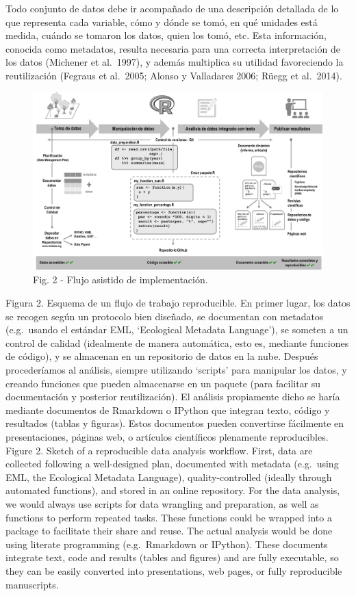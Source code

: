 \documentclass[]{tufte-handout}
\begin{document}
Todo conjunto de datos debe ir acompañado de una descripción detallada
de lo que representa cada variable, cómo y dónde se tomó, en qué
unidades está medida, cuándo se tomaron los datos, quien los tomó, etc.
Esta información, conocida como metadatos, resulta necesaria para una
correcta interpretación de los datos (Michener et al.~1997), y además
multiplica su utilidad favoreciendo la reutilización (Fegraus et
al.~2005; Alonso y Valladares 2006; Rüegg et al.~2014).

\begin{figure}
\includegraphics[width=1\linewidth]{images/fig_-001} \caption[Fig]{Fig. 2 - Flujo asistido de implementación.}\label{fig:unnamed-chunk-2}
\end{figure}

Figura 2. Esquema de un flujo de trabajo reproducible. En primer lugar,
los datos se recogen según un protocolo bien diseñado, se documentan con
metadatos (e.g.~usando el estándar EML, `Ecological Metadata Language'),
se someten a un control de calidad (idealmente de manera automática,
esto es, mediante funciones de código), y se almacenan en un repositorio
de datos en la nube. Después procederíamos al análisis, siempre
utilizando `scripts' para manipular los datos, y creando funciones que
pueden almacenarse en un paquete (para facilitar su documentación y
posterior reutilización). El análisis propiamente dicho se haría
mediante documentos de Rmarkdown o IPython que integran texto, código y
resultados (tablas y figuras). Estos documentos pueden convertirse
fácilmente en presentaciones, páginas web, o artículos científicos
plenamente reproducibles. Figure 2. Sketch of a reproducible data
analysis workflow. First, data are collected following a well-designed
plan, documented with metadata (e.g.~using EML, the Ecological Metadata
Language), quality-controlled (ideally through automated functions), and
stored in an online repository. For the data analysis, we would always
use scripts for data wrangling and preparation, as well as functions to
perform repeated tasks. These functions could be wrapped into a package
to facilitate their share and reuse. The actual analysis would be done
using literate programming (e.g.~Rmarkdown or IPython). These documents
integrate text, code and results (tables and figures) and are fully
executable, so they can be easily converted into presentations, web
pages, or fully reproducible manuscripts.
\end{document}
